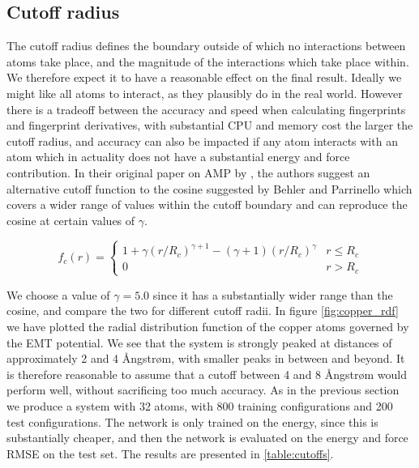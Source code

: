 \subsection{Cutoff radius}
The cutoff radius defines the boundary outside of which no interactions
between atoms take place, and the magnitude of the interactions
which take place within. We therefore expect it to have a reasonable
effect on the final result. Ideally we might like all atoms to interact,
as they plausibly do in the real world. However there is a tradeoff
between the accuracy and speed when calculating fingerprints and
fingerprint derivatives, with substantial CPU and memory cost the
larger the cutoff radius, and accuracy can also be impacted if any
atom interacts with an atom which in actuality does not have a substantial
energy and force contribution.
In their original paper on AMP by \parencite[Khorshidi and Peterson]{
khorshidi2016amp}, the authors suggest an alternative cutoff
function to the cosine suggested by Behler and Parrinello
which covers a wider range of values within the cutoff boundary
and can reproduce the cosine at certain values of $\gamma$.

\begin{equation}
    f_c(r) =
    \begin{cases}
        1 + \gamma (r / R_c)^{\gamma + 1} - (\gamma + 1)
        (r / R_c)^{\gamma} & r \leq R_c \\
        0 & r > R_c
    \end{cases}
\end{equation}

We choose a value of $\gamma = 5.0$ since it has a substantially wider
range than the cosine, and compare the two for different cutoff radii.
In figure \ref{fig:copper_rdf} we have plotted the radial distribution
function of the copper atoms governed by the EMT potential.
We see that the system is strongly peaked at distances of approximately
2 and 4 Ångstrøm, with smaller peaks in between and beyond.
It is therefore reasonable to assume that a cutoff between 4
and 8 Ångstrøm would perform well, without sacrificing too much
accuracy.
As in the previous section we produce a system with 32 atoms, with
800 training configurations and 200 test configurations. The network
is only trained on the energy, since this is substantially cheaper,
and then the network is evaluated on the energy and force RMSE
on the test set. The results are presented in \ref{table:cutoffs}.

